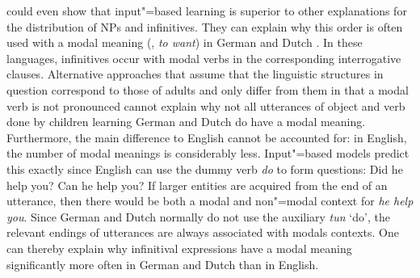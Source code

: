 \citet*{FPG2009a} could even show that input"=based learning is superior to other explanations for the distribution of
NPs and infinitives. They can explain why this order is often used with a modal meaning (\eg, \emph{to want})
in German and Dutch \citep{IT96a}. 
In these languages, infinitives occur with modal verbs in the corresponding interrogative clauses. Alternative approaches that
assume that the linguistic structures in question correspond to those of adults and only differ from them in that a modal verb
is not pronounced cannot explain why not all utterances of object and verb done by children learning German and Dutch do have a modal meaning.
Furthermore, the main difference to English cannot be accounted for: in English, the number of modal meanings is considerably
less. Input"=based models predict this exactly since English can use the dummy verb \emph{do} to form questions:
\eal
\ex Did he help you?
\ex Can he help you?
\zl
If larger entities are acquired from the end of an utterance, then there would be both a modal and non"=modal
context for \emph{he help you}. Since German and Dutch normally do not use the auxiliary \emph{tun} `do', 
the relevant endings of utterances are always associated with modals contexts.  One can thereby explain
why infinitival expressions have a modal meaning significantly more often in German and Dutch than in English. 

